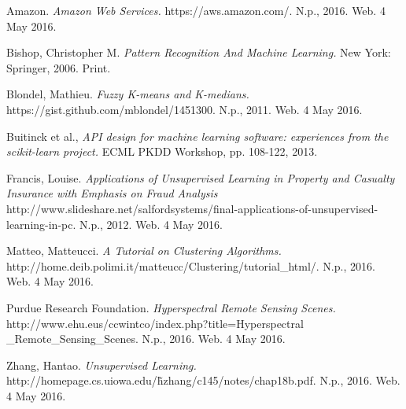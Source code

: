 \documentclass[journal]{IEEEtran}
\begin{document}
\begin{thebibliography}{1}

  Amazon. \emph{Amazon Web Services.} https://aws.amazon.com/. N.p., 2016. Web. 4 May 2016.

  Bishop, Christopher M. \emph{Pattern Recognition And Machine Learning.} New York: Springer, 2006. Print.

  Blondel, Mathieu. \emph{Fuzzy K-means and K-medians.} https://gist.github.com/mblondel/1451300. N.p., 2011. Web. 4 May 2016.

  Buitinck et al., \emph{API design for machine learning software: experiences from the scikit-learn project.} ECML PKDD Workshop, pp. 108-122, 2013.

  Francis, Louise. \emph{Applications of Unsupervised Learning in Property and Casualty Insurance with Emphasis on Fraud Analysis} http://www.slideshare.net/salfordsystems/final-applications-of-unsupervised-learning-in-pc. N.p., 2012. Web. 4 May 2016.

  Matteo, Matteucci. \emph{A Tutorial on Clustering Algorithms.} http://home.deib.polimi.it/matteucc/Clustering/tutorial\_html/. N.p., 2016. Web. 4 May 2016.

  Purdue Research Foundation. \emph{Hyperspectral Remote Sensing Scenes.} http://www.ehu.eus/ccwintco/index.php?title=Hyperspectral \_Remote\_Sensing\_Scenes. N.p., 2016. Web. 4 May 2016.

  Zhang, Hantao. \emph{Unsupervised Learning.} http://homepage.cs.uiowa.edu/\~hzhang/c145/notes/chap18b.pdf. N.p., 2016. Web. 4 May 2016.

\end{thebibliography}
\end{document}
